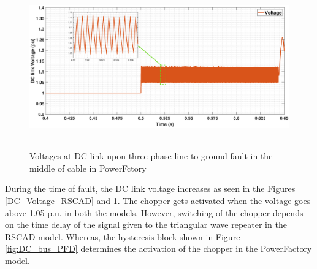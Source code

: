 \begin{figure}[H]
    \includegraphics[height = 7cm,width = \textwidth]{Diagrams/Appendix_B/DC_Voltage_PFD.eps}
    \caption{Voltages at DC link upon three-phase line to ground fault in the middle of cable in PowerFctory}
    \label{DC_Voltage_PFD}
\end{figure}

During the time of fault, the \gls{DC} link voltage increases as seen in the Figures \ref{DC_Voltage_RSCAD} and \ref{DC_Voltage_PFD}. The chopper gets activated when the voltage goes above 1.05 p.u. in both the models. However, switching of the chopper depends on the time delay of the signal given to the triangular wave repeater in the RSCAD model. Whereas, the hysteresis block shown in Figure \ref{fig:DC_bus_PFD} determines the activation of the chopper in the PowerFactory model. 
